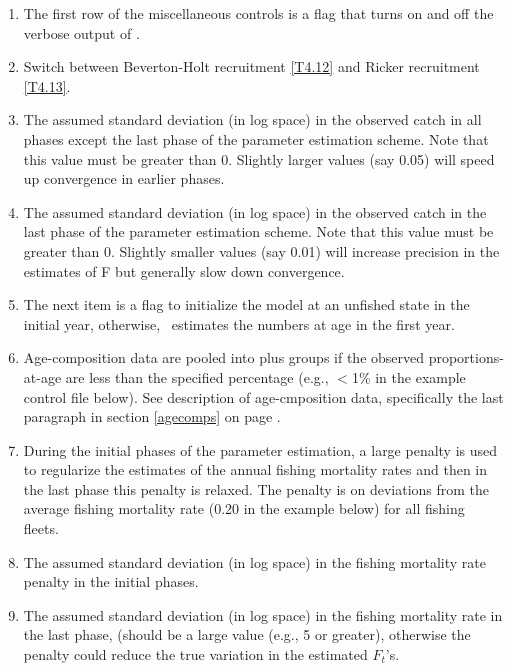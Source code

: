 \begin{multicols}{2}
\begin{enumerate}

	\item The first row of the miscellaneous controls is a flag that turns on and off the verbose output of \iscam.

	\item Switch between Beverton-Holt  recruitment \eqref{T4.12} and Ricker recruitment \eqref{T4.13}.
	
	\item The assumed standard deviation (in log space) in the observed catch in all phases except the last phase of the parameter estimation scheme.  Note that this value must be greater than 0.  Slightly larger values (say 0.05) will speed up convergence in earlier phases.
	
	\item The assumed standard deviation (in log space) in the observed catch in the last phase of the parameter estimation scheme.  Note that this value must be greater than 0.  Slightly smaller values (say 0.01) will increase precision in the estimates of F but generally slow down convergence.
		
	\item The next item is a flag to initialize the model at an unfished state in the initial year, otherwise, \iscam\ estimates the numbers at age in the first year.
	
	\item Age-composition data are pooled into plus groups if the observed proportions-at-age are less than the specified percentage (e.g., $<$1\% in the example control file below).  See description of age-cmposition data, specifically the last paragraph in section \ref{agecomps} on page \pageref{agecomps}.
	
	\item During the initial phases of the parameter estimation, a large penalty is used to regularize the estimates of the annual fishing mortality rates and then in the last phase this penalty is relaxed.  The penalty is on deviations from the average fishing mortality rate (0.20 in the example below) for all fishing fleets.  
	
	\item The assumed standard deviation (in log space) in the fishing mortality rate penalty in the initial phases.
	
	\item The assumed standard deviation (in log space) in the fishing mortality rate in the last phase, (should be a large value (e.g., 5 or greater), otherwise the penalty could reduce the true variation in the estimated $F_t$'s.
	

\end{enumerate}
\end{multicols}
